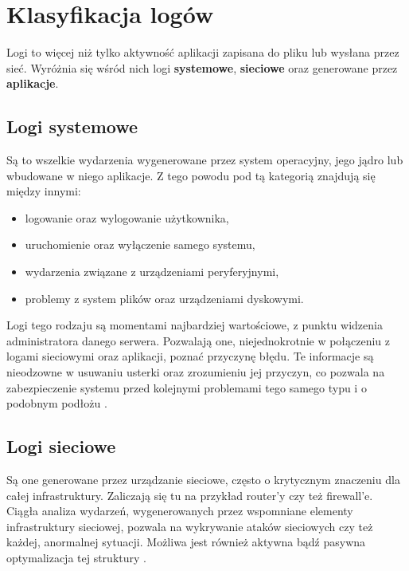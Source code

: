 \section{Klasyfikacja logów}
\label{chapter:logs:classification}

Logi to więcej niż tylko aktywność aplikacji zapisana do pliku lub wysłana przez sieć.
Wyróżnia się wśród nich logi \textbf{systemowe}, \textbf{sieciowe} oraz generowane przez \textbf{aplikacje}.

    \subsection{Logi systemowe}
    \label{chapter:logs:classification:system}
    Są to wszelkie wydarzenia wygenerowane przez system operacyjny, jego jądro lub 
    wbudowane w niego aplikacje. Z tego powodu pod tą kategorią znajdują się między innymi:
    \begin{itemize}
        \item logowanie oraz wylogowanie użytkownika,
        \item uruchomienie oraz wyłączenie samego systemu,
        \item wydarzenia związane z urządzeniami peryferyjnymi,
        \item problemy z system plików oraz urządzeniami dyskowymi.
    \end{itemize}
    Logi tego rodzaju są momentami najbardziej wartościowe, z punktu widzenia administratora
    danego serwera. Pozwalają one, niejednokrotnie w połączeniu z logami sieciowymi oraz 
    aplikacji, poznać przyczynę błędu. Te informacje są nieodzowne w usuwaniu usterki
    oraz zrozumieniu jej przyczyn, co pozwala na zabezpieczenie systemu przed kolejnymi
    problemami tego samego typu i o podobnym podłożu \cite{logging_log_management}.
    
    \subsection{Logi sieciowe}
    \label{chapter:logs:classification:network}
    Są one generowane przez urządzanie sieciowe, często o krytycznym znaczeniu dla całej infrastruktury. 
    Zaliczają się tu na przykład router'y czy też firewall'e. Ciągła analiza wydarzeń, wygenerowanych przez 
    wspomniane elementy infrastruktury sieciowej, pozwala na wykrywanie ataków sieciowych
    czy też każdej, anormalnej sytuacji. Możliwa jest również aktywna bądź pasywna 
    optymalizacja tej struktury \cite{logging_log_management}. 
    
